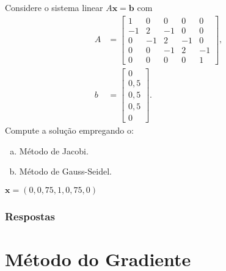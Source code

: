 \begin{exer}
  Considere o sistema linear $A\pmb{x} = \pmb{b}$ com
  \begin{align}
    A &=
        \begin{bmatrix}
          1& 0& 0& 0& 0\\
          -1& 2& -1& 0& 0\\
          0& -1& 2& -1& 0\\
          0& 0& -1& 2& -1\\
          0& 0& 0& 0& 1
        \end{bmatrix},\\
    b &=
        \begin{bmatrix}
          0\\
          0,5\\
          0,5\\
          0,5\\
          0
        \end{bmatrix}.
  \end{align}
  Compute a solução empregando o:
  \begin{enumerate}[a)]
  \item Método de Jacobi.
  \item Método de Gauss-Seidel.
  \end{enumerate}
\end{exer}
\begin{resp}
  $\pmb{x} = (0, 0,75, 1, 0,75, 0)$
\end{resp}

\ifisbook
\subsubsection{Respostas}
\shipoutAnswer
\fi


\section{Método do Gradiente}\label{cap_sislin_sec_metg}

